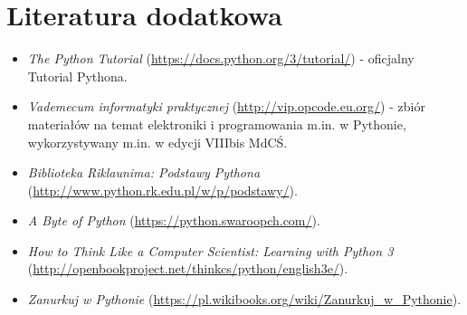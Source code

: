 % 
% 
% 
% 

\section{Literatura dodatkowa {\Symbola 🤔}}

\begin{itemize}
\item \emph{The Python Tutorial} (\url{https://docs.python.org/3/tutorial/}) - oficjalny Tutorial Pythona.
\item \emph{Vademecum informatyki praktycznej} (\url{http://vip.opcode.eu.org/}) - zbiór materiałów na temat elektroniki i programowania m.in. w Pythonie, wykorzystywany m.in. w edycji VIIIbis MdCŚ.
\item \emph{Biblioteka Riklaunima: Podstawy Pythona} (\url{http://www.python.rk.edu.pl/w/p/podstawy/}).
\item \emph{A Byte of Python} (\url{https://python.swaroopch.com/}).
\item \emph{How to Think Like a Computer Scientist: Learning with Python 3} (\url{http://openbookproject.net/thinkcs/python/english3e/}).
\item \emph{Zanurkuj w Pythonie} (\url{https://pl.wikibooks.org/wiki/Zanurkuj_w_Pythonie}).
\end{itemize}
